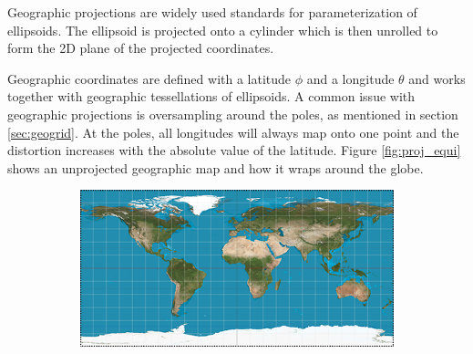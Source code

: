 Geographic projections are widely used standards for parameterization of ellipsoids. The ellipsoid is projected onto a cylinder which is then unrolled to form the 2D plane of the projected coordinates.

Geographic coordinates are defined with a latitude $\phi$ and a longitude $\theta$ and works together with geographic tessellations of ellipsoids. A common issue with geographic projections is oversampling around the poles, as mentioned in section \ref{sec:geogrid}. At the poles, all longitudes will always map onto one point and the distortion increases with the absolute value of the latitude. Figure \ref{fig:proj_equi} shows an unprojected geographic map and how it wraps around the globe.

\begin{figure}[htbp]
    \centering
    \begin{subfigure}[bt]{0.4\textwidth}
        \includegraphics[width=\textwidth]{figures/developable_projected/equirectangular.png}
    \end{subfigure}
    \qquad
    \begin{subfigure}[bt]{0.15\textwidth}

\end{subfigure}
\end{figure}
